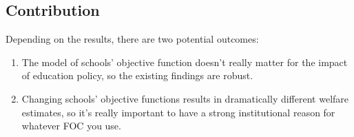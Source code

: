 \documentclass[dvipsnames]{article}
\begin{document}
  \subsection{Contribution}
  Depending on the results, there are two potential outcomes:
  \begin{enumerate}
  \item The model of schools' objective function doesn't really matter for the impact of education policy, so the existing findings are robust.
    \item Changing schools' objective functions results in dramatically different welfare estimates, so it's really important to have a strong institutional reason for whatever FOC you use.
  \end{enumerate}
\end{document}
